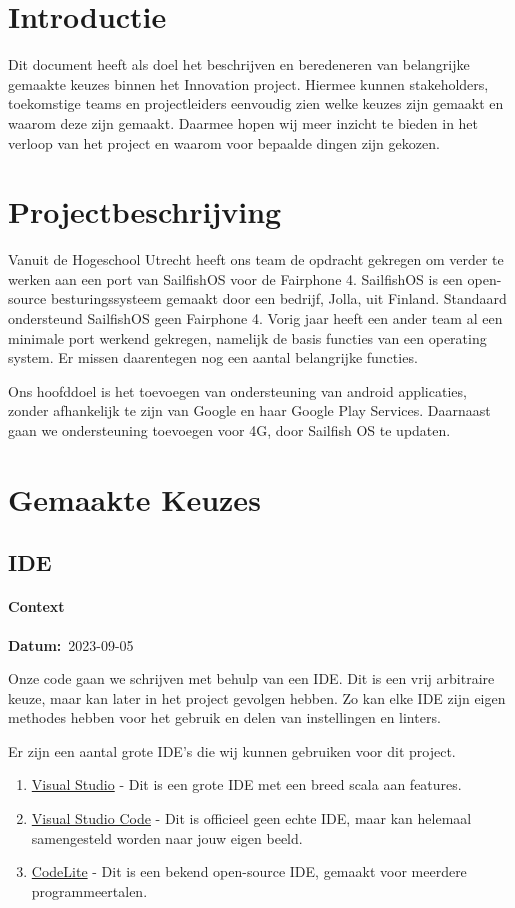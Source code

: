 \documentclass[a4paper]{report}
\newcommand{\personalbox}{
  \begin{tcolorbox}[hbox, colback=green!5!white,colframe=green!75!black,
    left=.1mm, right=.1mm, top=.1mm, bottom=.1mm, fontupper=\scriptsize\sffamily]
    Persoonlijke Keuze
  \end{tcolorbox}
}
\newcommand{\personalchoice}[1]{
  \section[ #1 ]{#1~\mbox{\raisebox{-2.5pt}{\personalbox}}}
}
\newcommand{\timestamp}[1]{
  \mbox{\scriptsize \textbf{Datum:} #1} \smallbreak
}
\begin{document}
\chapter{Introductie}
Dit document heeft als doel het beschrijven en beredeneren van belangrijke gemaakte keuzes binnen het Innovation project. 
Hiermee kunnen stakeholders, toekomstige teams en projectleiders eenvoudig zien welke keuzes zijn gemaakt en waarom deze zijn gemaakt.
Daarmee hopen wij meer inzicht te bieden in het verloop van het project en waarom voor bepaalde dingen zijn gekozen. 
\vspace{1.5cm}

\begingroup
\let\clearpage\relax
\chapter{Projectbeschrijving}
Vanuit de Hogeschool Utrecht heeft ons team de opdracht gekregen om verder te werken aan een port van SailfishOS voor de Fairphone 4.
SailfishOS is een open-source besturingssysteem gemaakt door een bedrijf, Jolla, uit Finland. Standaard ondersteund SailfishOS geen Fairphone 4.
Vorig jaar heeft een ander team al een minimale port werkend gekregen, namelijk de basis functies van een operating system. Er missen daarentegen nog een aantal belangrijke functies.
\par \smallskip
Ons hoofddoel is het toevoegen van ondersteuning van android applicaties, zonder afhankelijk te zijn van Google en haar Google Play Services\texttrademark. 
Daarnaast gaan we ondersteuning toevoegen voor 4G, door Sailfish OS te updaten.
\endgroup

\chapter{Gemaakte Keuzes}
\personalchoice{IDE}
\subsubsection{Context}
\timestamp{2023-09-05}
Onze code gaan we schrijven met behulp van een IDE. Dit is een vrij arbitraire keuze, maar kan later in het project gevolgen hebben. 
Zo kan elke IDE zijn eigen methodes hebben voor het gebruik en delen van instellingen en linters. 
\par\smallskip
Er zijn een aantal grote IDE's die wij kunnen gebruiken voor dit project. 
\begin{enumerate}
  \item \href{https://visualstudio.microsoft.com/}{Visual Studio} - Dit is een grote IDE met een breed scala aan features.
  \item \href{https://code.visualstudio.com/}{Visual Studio Code} - Dit is officieel geen echte IDE, maar kan helemaal samengesteld worden naar jouw eigen beeld.
  \item \href{https://codelite.org/}{CodeLite} - Dit is een bekend open-source IDE, gemaakt voor meerdere programmeertalen.
\end{enumerate}
\end{document}
